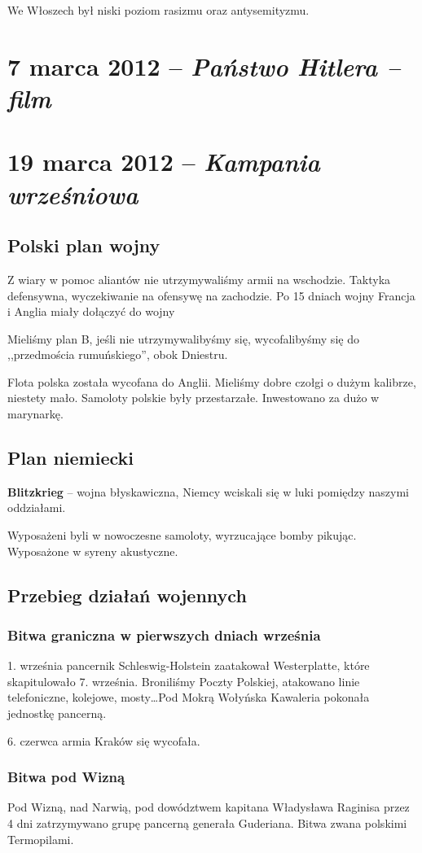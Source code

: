 \documentclass [a4paper, 11pt, oneside]{book}
\begin{document}
			We Włoszech był niski poziom rasizmu oraz antysemityzmu.
\chapter{7 marca 2012 -- \textit{Państwo Hitlera -- film}}
\chapter{19 marca 2012 -- \textit{Kampania wrześniowa}}

\section{Polski plan wojny}
Z wiary w pomoc aliantów nie utrzymywaliśmy armii na wschodzie. Taktyka defensywna, wyczekiwanie na ofensywę na zachodzie. Po 15 dniach wojny Francja i Anglia miały dołączyć do wojny

Mieliśmy plan B, jeśli nie utrzymywalibyśmy się, wycofalibyśmy się do ,,przedmościa rumuńskiego'', obok Dniestru.

Flota polska została wycofana do Anglii. Mieliśmy dobre czołgi o dużym kalibrze, niestety mało. Samoloty polskie były przestarzałe. Inwestowano za dużo w marynarkę.

\section{Plan niemiecki}
\textbf{Blitzkrieg} -- wojna błyskawiczna, Niemcy wciskali się w luki pomiędzy naszymi oddziałami.

Wyposażeni byli w nowoczesne samoloty, wyrzucające bomby pikując. Wyposażone w syreny akustyczne.

\section{Przebieg działań wojennych}
\subsection{Bitwa graniczna w pierwszych dniach września}
1. września pancernik Schleswig-Holstein zaatakował Westerplatte, które skapitulowało 7. września. Broniliśmy Poczty Polskiej, atakowano linie telefoniczne, kolejowe, mosty\dots Pod Mokrą Wołyńska Kawaleria pokonała jednostkę pancerną.

6. czerwca armia Kraków się wycofała.

\subsection{Bitwa pod Wizną}
Pod Wizną, nad Narwią, pod dowództwem kapitana Władysława Raginisa przez 4 dni zatrzymywano grupę pancerną generała Guderiana. Bitwa zwana polskimi Termopilami.
\end{document}
